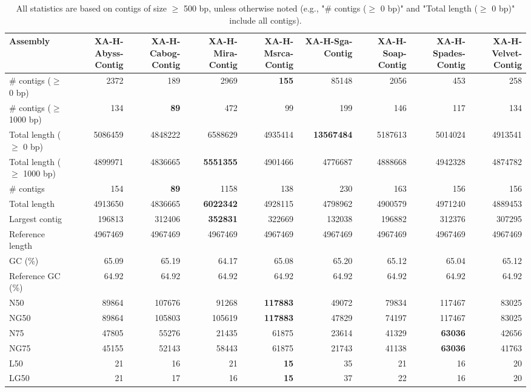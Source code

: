 \documentclass[12pt,a4paper]{article}
\begin{document}
\begin{table}[ht]
\begin{center}
\caption{All statistics are based on contigs of size $\geq$ 500 bp, unless otherwise noted (e.g., "\# contigs ($\geq$ 0 bp)" and "Total length ($\geq$ 0 bp)" include all contigs).}
\begin{tabular}{|l*{8}{|r}|}
\hline
Assembly & XA-H-Abyss-Contig & XA-H-Cabog-Contig & XA-H-Mira-Contig & XA-H-Msrca-Contig & XA-H-Sga-Contig & XA-H-Soap-Contig & XA-H-Spades-Contig & XA-H-Velvet-Contig \\ \hline
\# contigs ($\geq$ 0 bp) & 2372 & 189 & 2969 & {\bf 155} & 85148 & 2056 & 453 & 258 \\ \hline
\# contigs ($\geq$ 1000 bp) & 134 & {\bf 89} & 472 & 99 & 199 & 146 & 117 & 134 \\ \hline
Total length ($\geq$ 0 bp) & 5086459 & 4848222 & 6588629 & 4935414 & {\bf 13567484} & 5187613 & 5014024 & 4913541 \\ \hline
Total length ($\geq$ 1000 bp) & 4899971 & 4836665 & {\bf 5551355} & 4901466 & 4776687 & 4888668 & 4942328 & 4874782 \\ \hline
\# contigs & 154 & {\bf 89} & 1158 & 138 & 230 & 163 & 156 & 156 \\ \hline
Total length & 4913650 & 4836665 & {\bf 6022342} & 4928115 & 4798962 & 4900579 & 4971240 & 4889453 \\ \hline
Largest contig & 196813 & 312406 & {\bf 352831} & 322669 & 132038 & 196882 & 312376 & 307295 \\ \hline
Reference length & 4967469 & 4967469 & 4967469 & 4967469 & 4967469 & 4967469 & 4967469 & 4967469 \\ \hline
GC (\%) & 65.09 & 65.19 & 64.17 & 65.08 & 65.20 & 65.12 & 65.04 & 65.12 \\ \hline
Reference GC (\%) & 64.92 & 64.92 & 64.92 & 64.92 & 64.92 & 64.92 & 64.92 & 64.92 \\ \hline
N50 & 89864 & 107676 & 91268 & {\bf 117883} & 49072 & 79834 & 117467 & 83025 \\ \hline
NG50 & 89864 & 105803 & 105619 & {\bf 117883} & 47829 & 74197 & 117467 & 83025 \\ \hline
N75 & 47805 & 55276 & 21435 & 61875 & 23614 & 41329 & {\bf 63036} & 42656 \\ \hline
NG75 & 45155 & 52143 & 58443 & 61875 & 21743 & 41138 & {\bf 63036} & 41763 \\ \hline
L50 & 21 & 16 & 21 & {\bf 15} & 35 & 21 & 16 & 20 \\ \hline
LG50 & 21 & 17 & 16 & {\bf 15} & 37 & 22 & 16 & 20 \\ \hline

\end{tabular}
\end{center}
\end{table}
\end{document}

